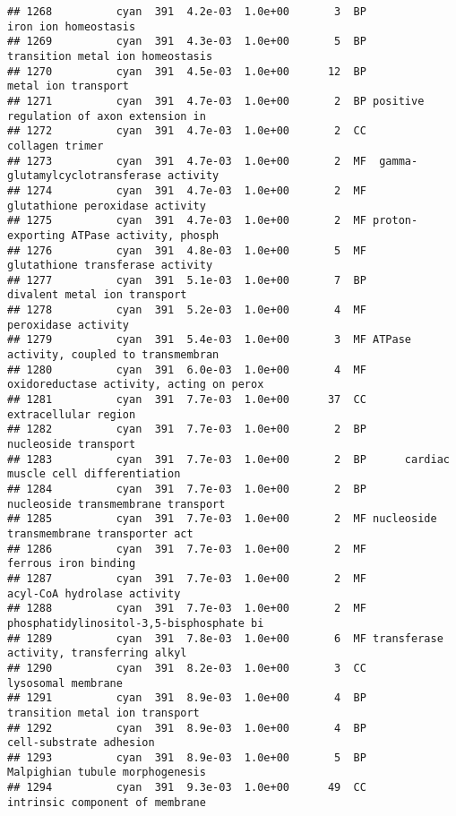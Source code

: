 \documentclass[]{article}
\begin{document}
\begin{verbatim}
## 1268          cyan  391  4.2e-03  1.0e+00       3  BP                     iron ion homeostasis
## 1269          cyan  391  4.3e-03  1.0e+00       5  BP         transition metal ion homeostasis
## 1270          cyan  391  4.5e-03  1.0e+00      12  BP                      metal ion transport
## 1271          cyan  391  4.7e-03  1.0e+00       2  BP positive regulation of axon extension in
## 1272          cyan  391  4.7e-03  1.0e+00       2  CC                          collagen trimer
## 1273          cyan  391  4.7e-03  1.0e+00       2  MF  gamma-glutamylcyclotransferase activity
## 1274          cyan  391  4.7e-03  1.0e+00       2  MF          glutathione peroxidase activity
## 1275          cyan  391  4.7e-03  1.0e+00       2  MF proton-exporting ATPase activity, phosph
## 1276          cyan  391  4.8e-03  1.0e+00       5  MF         glutathione transferase activity
## 1277          cyan  391  5.1e-03  1.0e+00       7  BP             divalent metal ion transport
## 1278          cyan  391  5.2e-03  1.0e+00       4  MF                      peroxidase activity
## 1279          cyan  391  5.4e-03  1.0e+00       3  MF ATPase activity, coupled to transmembran
## 1280          cyan  391  6.0e-03  1.0e+00       4  MF oxidoreductase activity, acting on perox
## 1281          cyan  391  7.7e-03  1.0e+00      37  CC                     extracellular region
## 1282          cyan  391  7.7e-03  1.0e+00       2  BP                     nucleoside transport
## 1283          cyan  391  7.7e-03  1.0e+00       2  BP      cardiac muscle cell differentiation
## 1284          cyan  391  7.7e-03  1.0e+00       2  BP       nucleoside transmembrane transport
## 1285          cyan  391  7.7e-03  1.0e+00       2  MF nucleoside transmembrane transporter act
## 1286          cyan  391  7.7e-03  1.0e+00       2  MF                     ferrous iron binding
## 1287          cyan  391  7.7e-03  1.0e+00       2  MF              acyl-CoA hydrolase activity
## 1288          cyan  391  7.7e-03  1.0e+00       2  MF phosphatidylinositol-3,5-bisphosphate bi
## 1289          cyan  391  7.8e-03  1.0e+00       6  MF transferase activity, transferring alkyl
## 1290          cyan  391  8.2e-03  1.0e+00       3  CC                       lysosomal membrane
## 1291          cyan  391  8.9e-03  1.0e+00       4  BP           transition metal ion transport
## 1292          cyan  391  8.9e-03  1.0e+00       4  BP                  cell-substrate adhesion
## 1293          cyan  391  8.9e-03  1.0e+00       5  BP          Malpighian tubule morphogenesis
## 1294          cyan  391  9.3e-03  1.0e+00      49  CC          intrinsic component of membrane

\end{verbatim}
\end{document}

